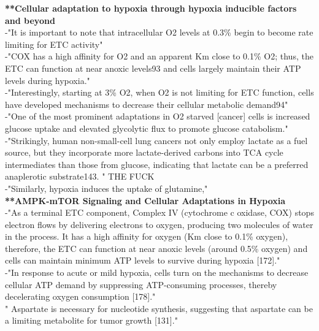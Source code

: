 \documentclass[11pt,a4paper]{article}
\begin{document}
\textbf{**Cellular adaptation to hypoxia through hypoxia inducible factors and beyond} \\

-"It is important to note that intracellular O2 levels at 0.3\% begin to become rate limiting for ETC activity"\\

-"COX has a high affinity for O2 and an apparent Km close to 0.1\% O2; thus, the ETC can function at near anoxic levels93 and cells largely maintain their ATP levels during hypoxia."\\

-"Interestingly, starting at 3\% O2, when O2 is not limiting for ETC function, cells have developed mechanisms to decrease their cellular metabolic demand94"\\

-"One of the most prominent adaptations in O2 starved [cancer] cells is increased glucose uptake and elevated glycolytic flux to promote glucose catabolism."\\

-"Strikingly, human non-small-cell lung cancers not only employ lactate as a fuel source, but they incorporate more lactate-derived carbons into TCA cycle intermediates than those from glucose, indicating that lactate can be a preferred anaplerotic substrate143. " THE FUCK\\

-"Similarly, hypoxia induces the uptake of glutamine,"\\

\textbf{**AMPK-mTOR Signaling and Cellular Adaptations in Hypoxia}\\

-"As a terminal ETC component, Complex IV (cytochrome c oxidase, COX) stops electron flows by delivering electrons to oxygen, producing two molecules of water in the process. It has a high affinity for oxygen (Km close to 0.1\% oxygen), therefore, the ETC can function at near anoxic levels (around 0.5\% oxygen) and cells can maintain minimum ATP levels to survive during hypoxia [172]."\\

-"In response to acute or mild hypoxia, cells turn on the mechanisms to decrease cellular ATP demand by suppressing ATP-consuming processes, thereby decelerating oxygen consumption [178]."\\

" Aspartate is necessary for nucleotide synthesis, suggesting that aspartate can be a limiting metabolite for tumor growth [131]."\\
\end{document}
